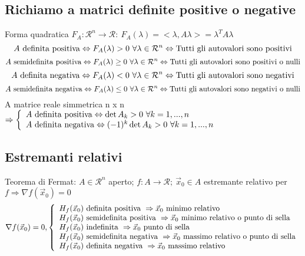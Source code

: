 \documentclass[]{article}
\newcommand{\ux}{\vec{x}}
\begin{document}
\subsection{Richiamo a matrici definite positive o negative}
Forma quadratica \(F_A:\mathcal{R}^n\to\mathcal{R}:\ F_A(\lambda)=<\lambda,A\lambda>=\lambda^T A \lambda \)
\[
A \textnormal{ definita positiva} \Leftrightarrow F_A(\lambda)>0 \ \forall \lambda\in\mathcal{R}^n \Leftrightarrow \textnormal{Tutti gli autovalori sono positivi}
\]
\[
A \textnormal{ semidefinita positiva} \Leftrightarrow F_A(\lambda)\ge0 \ \forall \lambda\in\mathcal{R}^n \Leftrightarrow \textnormal{Tutti gli autovalori sono positivi o nulli}
\]
\[
A \textnormal{ definita negativa} \Leftrightarrow F_A(\lambda)<0 \ \forall \lambda\in\mathcal{R}^n \Leftrightarrow \textnormal{Tutti gli autovalori sono negativi}
\]
\[
A \textnormal{ semidefinita negativa} \Leftrightarrow F_A(\lambda)\le0 \ \forall \lambda\in\mathcal{R}^n \Leftrightarrow \textnormal{Tutti gli autovalori sono negativi o nulli}
\]
A matrice reale simmetrica n x n \(\Rightarrow \left\{\begin{array}{l}
A \textnormal{ definita positiva} \Leftrightarrow \det A_k>0 \ \forall k=1,...,n \\
A \textnormal{ definita negativa} \Leftrightarrow (-1)^k \det A_k>0 \ \forall k=1,...,n \\
\end{array}\right. \)

\subsection{Estremanti relativi}
Teorema di Fermat: \(A\in\mathcal{R}^n\) aperto; \(f:A\rightarrow\mathcal{R}; \ \ux_0 \in A\) estremante relativo per \(f \Rightarrow \nabla f(\ux_0)=0\) \newline
\[\nabla f(\ux_0)=0, \left\{\begin{array}{l}
H_f(\ux_0) \textnormal{ definita positiva } \Rightarrow \ux_0 \textnormal{ minimo relativo}\\
H_f(\ux_0) \textnormal{ semidefinita positiva } \Rightarrow \ux_0 \textnormal{ minimo relativo o punto di sella}\\
H_f(\ux_0) \textnormal{ indefinita } \Rightarrow \ux_0 \textnormal{ punto di sella}\\
H_f(\ux_0) \textnormal{ semidefinita negativa } \Rightarrow \ux_0 \textnormal{ massimo relativo o punto di sella}\\
H_f(\ux_0) \textnormal{ definita negativa } \Rightarrow \ux_0 \textnormal{ massimo relativo}
\end{array}\right.\]
\end{document}
